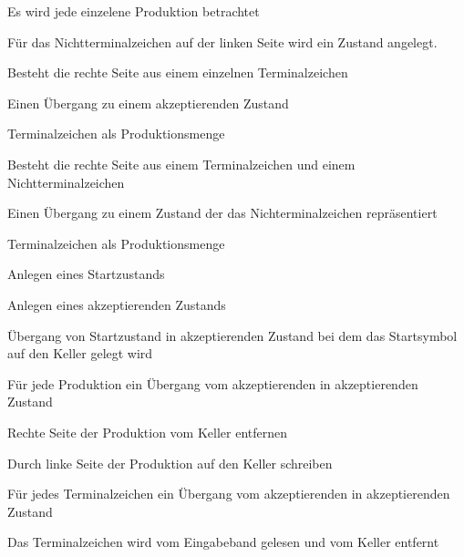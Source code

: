 {
    \begin{itemgroup}{}
	\item Es wird jede einzelene Produktion betrachtet
	\item Für das Nichtterminalzeichen auf der linken Seite wird ein Zustand
	angelegt.
	\item Besteht die rechte Seite aus einem einzelnen Terminalzeichen
  		\begin{itemgroup}{}
    	\item Einen Übergang zu einem akzeptierenden Zustand
    	\item Terminalzeichen als Produktionsmenge
    	\end{itemgroup}
	\item Besteht die rechte Seite aus einem Terminalzeichen und einem Nichtterminalzeichen
  		\begin{itemgroup}{}
    	\item Einen Übergang zu einem Zustand der das Nichterminalzeichen repräsentiert
		\item Terminalzeichen als Produktionsmenge
		 \end{itemgroup}
    \end{itemgroup}
	\vfill{}
}


{
    \begin{itemgroup}{}
	\item Anlegen eines Startzustands
	\item Anlegen eines akzeptierenden Zustands
	\item Übergang von Startzustand in akzeptierenden Zustand bei dem das 
	Startsymbol auf den Keller gelegt wird
	\item Für jede Produktion ein Übergang vom akzeptierenden in akzeptierenden
	Zustand
		\begin{itemgroup}{}
    	\item Rechte Seite der Produktion vom Keller entfernen
    	\item Durch linke Seite der Produktion auf den Keller schreiben
    	\end{itemgroup}
	\item Für jedes Terminalzeichen ein Übergang vom akzeptierenden in akzeptierenden
	Zustand
		\begin{itemgroup}{}
    	\item Das Terminalzeichen wird vom Eingabeband gelesen und vom Keller
    	entfernt \end{itemgroup}
	\end{itemgroup}
  
	\vfill{}
}


